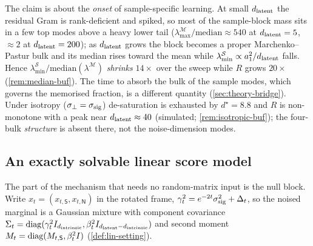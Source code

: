 \begin{remark}\label{rem:median-main}
The claim is about the \emph{onset} of sample-specific learning. At small $d_{\mathrm{latent}}$ the residual Gram is rank-deficient and spiked, so most of the sample-block mass sits in a few top modes above a heavy lower tail ($\lambda^{\mathcal M}_{\max}/\mathrm{median}\approx540$ at $d_{\mathrm{latent}}=5$, $\approx2$ at $d_{\mathrm{latent}}=200$); as $d_{\mathrm{latent}}$ grows the block becomes a proper Marchenko--Pastur bulk and its median rises toward the mean while $\lambda^{\mathcal S}_{\min}\propto a_1^2/d_{\mathrm{latent}}$ falls. Hence $\lambda^{\mathcal S}_{\min}/\mathrm{median}(\lambda^{\mathcal M})$ \emph{shrinks} $14\times$ over the sweep while $R$ grows $20\times$ (\cref{rem:median-buf}). The time to absorb the bulk of the sample modes, which governs the memorised fraction, is a different quantity (\cref{sec:theory-bridge}). Under isotropy ($\sigma_{\perp}=\sigma_{\mathrm{sig}}$) de-saturation is exhausted by $d^\star=8.8$ and $R$ is non-monotone with a peak near $d_{\mathrm{latent}}\approx40$ (simulated; \cref{rem:isotropic-buf}); the four-bulk \emph{structure} is absent there, not the noise-dimension modes.
\end{remark}

\subsection{An exactly solvable linear score model}
\label{sec:theory-linear}

The part of the mechanism that needs no random-matrix input is the null block. Write $x_t=(x_{t,\mathsf S},x_{t,\mathsf N})$ in the rotated frame, $\gamma_t^2=e^{-2t}\sigma_{\mathrm{sig}}^2+\Delta_t$, so the noised marginal is a Gaussian mixture with component covariance $\Sigma_t=\operatorname{diag}(\gamma_t^2I_{d_{\mathrm{intrinsic}}},\beta_t^2I_{d_{\mathrm{latent}}-d_{\mathrm{intrinsic}}})$ and second moment $M_t=\operatorname{diag}(M_{t,\mathsf S},\beta_t^2I)$ (\cref{def:lin-setting}).

